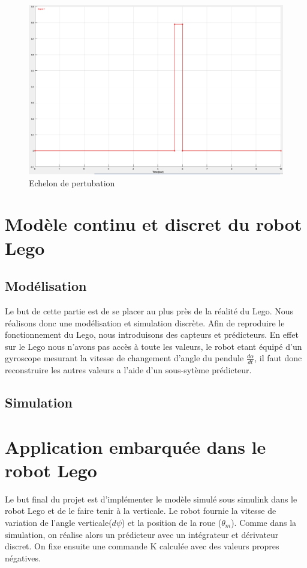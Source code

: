 \documentclass[11pt]{article}
\begin{document}
\begin{figure}[H]
	\includegraphics[scale=0.2]{images/pendule_inverse_perturbation}
	\caption{Echelon de pertubation}
\end{figure}


\section{Modèle continu et discret du robot Lego}
\subsection{Modélisation}
Le but de cette partie est de se placer au plus près de la réalité du Lego. Nous réalisons donc une modélisation et simulation discrète. Afin de reproduire le fonctionnement du Lego, nous introduisons des capteurs et prédicteurs. En effet sur le Lego nous n'avons pas accès à toute les valeurs, le robot etant équipé d'un gyroscope mesurant la vitesse de changement d'angle du pendule $\frac{d\alpha}{dt}$, il faut donc reconstruire les autres valeurs a l'aide d'un sous-sytème prédicteur.
\subsection{Simulation}

\section{Application embarquée dans le robot Lego}

Le but final du projet est d'implémenter le modèle simulé sous simulink dans le robot Lego et de le faire tenir à la verticale. Le robot fournie la vitesse de variation de l'angle verticale($d\psi$) et la position de la roue ($\theta_m$). Comme dans la simulation, on réalise alors un prédicteur avec un intégrateur et dérivateur discret. On fixe ensuite une commande K calculée avec des valeurs propres négatives.
\end{document}
